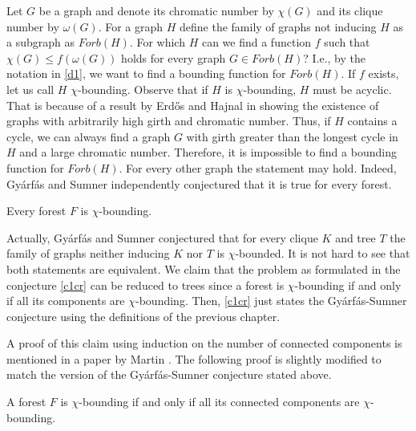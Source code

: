 Let $G$ be a graph and denote its chromatic number by $\chi (G)$ and its clique number by $\omega (G)$. For a graph $H$ define the family of graphs not inducing $H$ as a subgraph as $\textit{Forb}(H)$. For which $H$ can we find a function $f$ such that $\chi (G)\leq f(\omega (G))$ holds for every graph $G\in\textit{Forb}(H)$? I.e., by the notation in \ref{d1}, we want to find a bounding function for $\textit{Forb}(H)$. If $f$ exists, let us call $H$ $\chi $-bounding. Observe that if $H$ is $\chi $-bounding, $H$ must be acyclic. That is because of a result by Erd\H{o}s and Hajnal in \cite{EH66} showing the existence of graphs with arbitrarily high girth and chromatic number. Thus, if $H$ contains a cycle, we can always find a graph $G$ with girth greater than the longest cycle in $H$ and a large chromatic number. Therefore, it is impossible to find a bounding function for $\textit{Forb}(H)$. For every other graph the statement may hold. Indeed, Gyárfás \cite{Gy75} and Sumner \cite{Su81} independently conjectured that it is true for every forest.

\begin{con}\label{c1cr}
Every forest $F$ is $\chi$-bounding.
\end{con}

Actually, Gyárfás and Sumner conjectured that for every clique $K$ and tree $T$ the family of graphs neither inducing $K$ nor $T$ is $\chi$-bounded. It is not hard to see that both statements are equivalent. We claim that the problem as formulated in the conjecture \ref{c1cr} can be reduced to trees since a forest is $\chi$-bounding if and only if all its components are $\chi$-bounding. Then, \ref{c1cr} just states the Gyárfás-Sumner conjecture using the definitions of the previous chapter. 

A proof of this claim using induction on the number of connected components is mentioned in a paper by Martin \cite{Ma16}. The following proof is slightly modified to match the version of the Gyárfás-Sumner conjecture stated above.

\begin{thm}
A forest $F$ is $\chi$-bounding if and only if all its connected components are $\chi$-bounding.
\end{thm}

